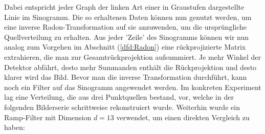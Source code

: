     			Dabei entspricht jeder Graph der linken Art einer in Graustufen dargestellte Linie im Sinogramm. Die so erhaltenen Daten können nun genutzt werden, um eine inverse Radon-Transformation auf sie anzuwenden, um die ursprüngliche Quellverteilung zu erhalten. Aus jeder 'Zeile' des Sinogramms können wir nun analog zum Vorgehen im Abschnitt (\ref{dfd:Radon}) eine rückprojizierte Matrix extrahieren, die man zur Gesamtrückprojektion aufsummiert. Je mehr Winkel der Detektor abfährt, desto mehr Summanden enthält die Rückprojektion und desto klarer wird das Bild. Bevor man die inverse Transformation durchführt, kann noch ein Filter auf das Sinogramm angewendet werden. Im konkreten Experiment lag eine Verteilung, die aus drei Punktquellen bestand, vor, welche in der folgenden Bilderserie schrittweise rekonstruiert wurde. Weiterhin wurde ein Ramp-Filter mit Dimension $d=13$ verwendet, um einen direkten Vergleich zu haben:\\
